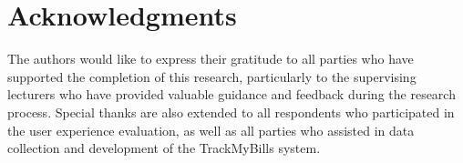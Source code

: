 \section*{Acknowledgments}

The authors would like to express their gratitude to all parties who have supported the completion of this research, particularly to the supervising lecturers who have provided valuable guidance and feedback during the research process. Special thanks are also extended to all respondents who participated in the user experience evaluation, as well as all parties who assisted in data collection and development of the TrackMyBills system.